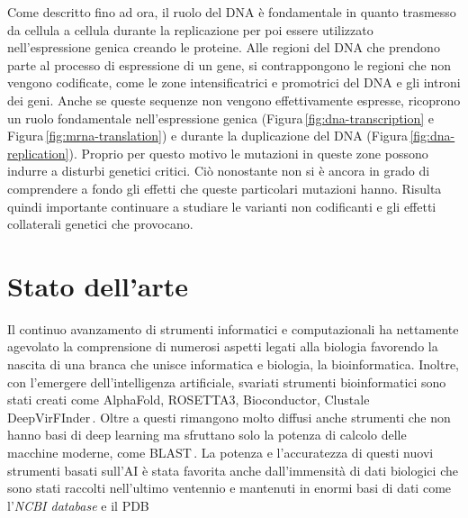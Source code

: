Come descritto fino ad ora, il ruolo del DNA è fondamentale in quanto trasmesso da cellula a cellula durante la replicazione per poi essere utilizzato nell'espressione genica creando le proteine. Alle regioni del DNA che prendono parte al processo di espressione di un gene, si contrappongono le regioni che non vengono codificate, come le zone intensificatrici e promotrici del DNA e gli introni dei geni. Anche se queste sequenze non vengono effettivamente espresse, ricoprono un ruolo fondamentale nell'espressione genica (Figura\,\ref{fig:dna-transcription} e Figura\,\ref{fig:mrna-translation}) e durante la duplicazione del DNA (Figura\,\ref{fig:dna-replication}). Proprio per questo motivo le mutazioni in queste zone possono indurre a disturbi genetici critici. Ciò nonostante non si è ancora in grado di comprendere a fondo gli effetti che queste particolari mutazioni hanno. Risulta quindi importante continuare a studiare le varianti non codificanti e gli effetti collaterali genetici che provocano.







\section{Stato dell'arte}

Il continuo avanzamento di strumenti informatici e computazionali ha nettamente agevolato la comprensione di numerosi aspetti legati alla biologia favorendo la nascita di una branca che unisce informatica e biologia, la bioinformatica. Inoltre, con l'emergere dell'intelligenza artificiale, svariati strumenti bioinformatici sono stati creati come AlphaFold, ROSETTA3, Bioconductor, Clustale  DeepVirFInder\,\cite{jumper2021highly, leaver2011rosetta3, gentleman2004bioconductor, larkin2007clustal, ren2020identifying}. Oltre a questi rimangono molto diffusi anche strumenti che non hanno basi di deep learning ma sfruttano solo la potenza di calcolo delle macchine moderne, come BLAST\,\cite{altschul1990basic}. La potenza e l'accuratezza di questi nuovi strumenti basati sull'AI è stata favorita anche dall'immensità di dati biologici che sono stati raccolti nell'ultimo ventennio e mantenuti in enormi basi di dati come l'\textit{NCBI database} e il PDB\,\cite{sherry2001dbsnp, burley2017protein}

